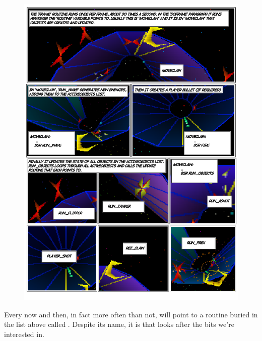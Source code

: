 \begin{figure}[H]
      \centering
      \includegraphics[width=13.7cm]{src/mainloop/mainloop-run_objects-comic.png}%
\end{figure}

Every now and then, in fact more often than not,  will point to a routine
buried in the list above called . Despite its name, it is  that looks after
the bits we're interested in.


